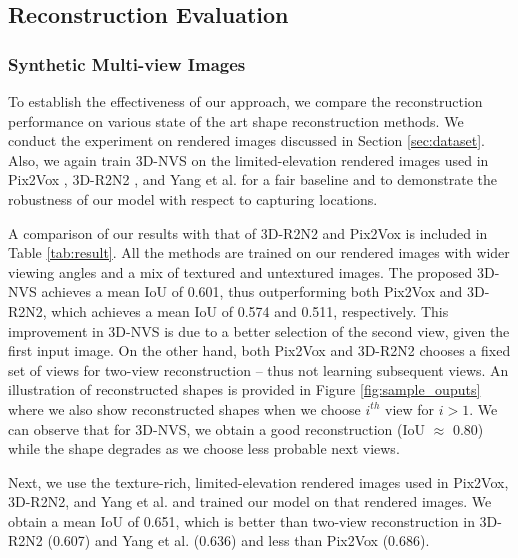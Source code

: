\subsection{Reconstruction Evaluation}
\label{sec:synthetic-results}
\subsubsection{Synthetic Multi-view Images}
To establish the effectiveness of our approach, we compare the reconstruction performance on various state of the art shape reconstruction methods. We conduct the experiment on rendered images discussed in Section \ref{sec:dataset}. Also, we again train 3D-NVS on the limited-elevation rendered images used in Pix2Vox \cite{pix2vox}, 3D-R2N2 \cite{3dr2n2}, and Yang et al. \cite{yang2018active} for a fair baseline and to demonstrate the robustness of our model with respect to capturing locations.

A comparison of our results with that of 3D-R2N2 and Pix2Vox is included in Table \ref{tab:result}. All the methods are trained on our rendered images with wider viewing angles and a mix of textured and untextured images. The proposed 3D-NVS  achieves a mean IoU of 0.601, thus outperforming both Pix2Vox and 3D-R2N2, which achieves a mean IoU of 0.574 and 0.511, respectively. This improvement in 3D-NVS is due to a better selection of the second view, given the first input image. On the other hand, both Pix2Vox and 3D-R2N2 chooses a fixed set of views for two-view reconstruction -- thus not learning subsequent views. An illustration of reconstructed shapes is provided in Figure \ref{fig:sample_ouputs} where we also show reconstructed shapes when we choose $i^{th}$ view for $i>1$. We can observe that for 3D-NVS, we obtain a good reconstruction (IoU $\approx$ 0.80) while the shape degrades as we choose less probable next views.

Next, we use the texture-rich, limited-elevation rendered images used in Pix2Vox, 3D-R2N2, and Yang et al. and trained our model on that rendered images. We obtain a mean IoU of 0.651, which is better than two-view reconstruction in 3D-R2N2 (0.607) and Yang et al. (0.636) and less than Pix2Vox (0.686).

